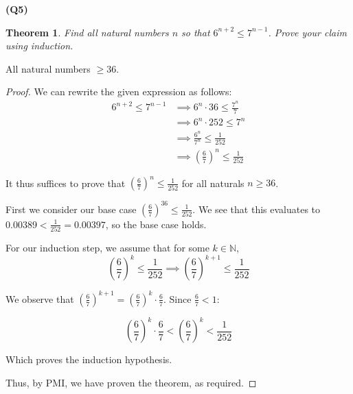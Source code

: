 \documentclass[12pt, a4paper]{article}
\newcommand{\N}{\mathbb{N}}
\newtheorem{theorem}{Theorem}
\begin{document}
\noindent\textbf{(Q5)}

\begin{theorem}
    Find all natural numbers $n$ so that $6^{n + 2} \leq 7^{n - 1}$. Prove your claim
    using induction.
\end{theorem}

All natural numbers $\geq 36$.

\begin{proof}
    We can rewrite the given expression as follows:
    \begin{align*}
        6^{n + 2} \leq 7^{n - 1} & \implies 6^n \cdot 36 \leq \frac{7^n}{7}\\
        & \implies 6^n \cdot 252 \leq 7^n\\
        & \implies \frac{6^n}{7^n} \leq \frac{1}{252}\\
        & \implies \left(\frac{6}{7}\right)^n \leq \frac{1}{252}
    \end{align*}

    It thus suffices to prove that $\left(\frac{6}{7}\right)^n \leq \frac{1}{252}$ for
    all naturals $n \geq 36$.

    First we consider our base case $\left(\frac{6}{7}\right)^36 \leq \frac{1}{252}$.
    We see that this evaluates to $0.00389 < \frac{1}{252} = 0.00397$, so the base case holds.

    For our induction step, we assume that for some $k \in \N$, 
    \[
        \left(\frac{6}{7}\right)^k \leq \frac{1}{252} \implies
        \left(\frac{6}{7}\right)^{k + 1} \leq \frac{1}{252}
    \]

    We observe that $\left(\frac{6}{7}\right)^{k + 1} = \left(\frac{6}{7}\right)^k \cdot \frac{6}{7}$.
    Since $\frac{6}{7} < 1$:
    
    \[
        \left(\frac{6}{7}\right)^k \cdot \frac{6}{7} < \left(\frac{6}{7}\right)^k < \frac{1}{252}
    \]

    Which proves the induction hypothesis.

    Thus, by PMI, we have proven the theorem, as required.
\end{proof}
\end{document}
